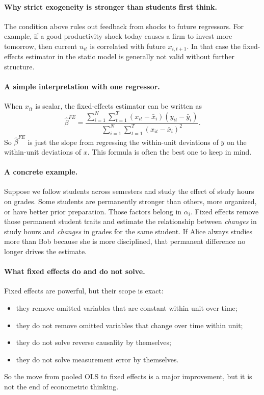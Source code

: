 \paragraph{Why strict exogeneity is stronger than students first think.}
The condition above rules out feedback from shocks to future regressors. For example, if a good productivity shock today causes a firm to invest more tomorrow, then current $u_{it}$ is correlated with future $x_{i,t+1}$. In that case the fixed-effects estimator in the static model is generally not valid without further structure.

\paragraph{A simple interpretation with one regressor.}
When $x_{it}$ is scalar, the fixed-effects estimator can be written as
\[
\hat{\beta}^{FE}
=
\frac{\sum_{i=1}^N \sum_{t=1}^T (x_{it}-\bar{x}_i)(y_{it}-\bar{y}_i)}
{\sum_{i=1}^N \sum_{t=1}^T (x_{it}-\bar{x}_i)^2}.
\]
So $\hat{\beta}^{FE}$ is just the slope from regressing the within-unit deviations of $y$ on the within-unit deviations of $x$. This formula is often the best one to keep in mind.

\paragraph{A concrete example.}
Suppose we follow students across semesters and study the effect of study hours on grades. Some students are permanently stronger than others, more organized, or have better prior preparation. Those factors belong in $\alpha_i$. Fixed effects remove those permanent student traits and estimate the relationship between \emph{changes} in study hours and \emph{changes} in grades for the same student. If Alice always studies more than Bob because she is more disciplined, that permanent difference no longer drives the estimate.

\paragraph{What fixed effects do and do not solve.}
Fixed effects are powerful, but their scope is exact:
\begin{itemize}
\item they remove omitted variables that are constant within unit over time;
\item they do not remove omitted variables that change over time within unit;
\item they do not solve reverse causality by themselves;
\item they do not solve measurement error by themselves.
\end{itemize}
So the move from pooled \ac{OLS} to fixed effects is a major improvement, but it is not the end of econometric thinking.

